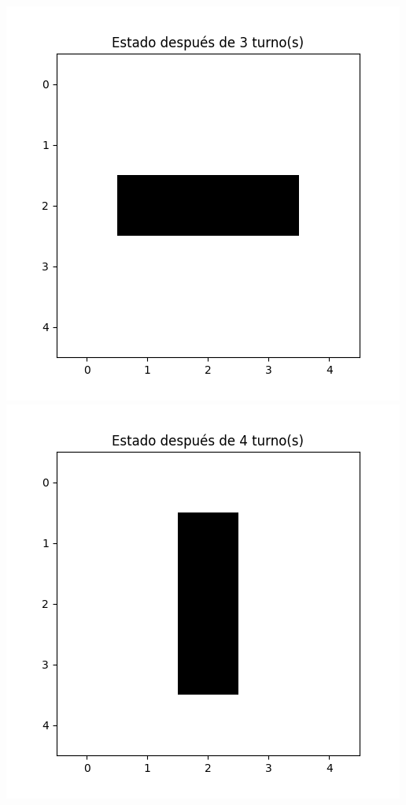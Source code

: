 \begin{enumerate}
\begin{itemize}
\begin{center}
    \includegraphics[scale=0.4]{Practica05/IMA/ejemplosJuegoVida/ejemplo 2.4.png}
    \includegraphics[scale=0.4]{Practica05/IMA/ejemplosJuegoVida/ejemplo 2.5.png}

\end{center}
\end{itemize}
\end{enumerate}
